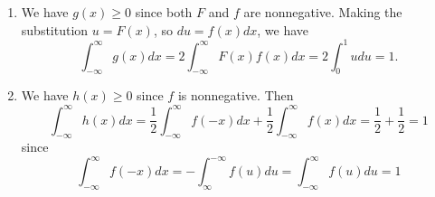 

\setcounter{theorem}{2}
\begin{exercise}[BH.5.3] 
\begin{solution}
    \begin{enumerate}
        \item We have $g(x) \geq 0$ since both $F$ and $f$ are nonnegative. Making the substitution $u=F(x)$, so $d u=f(x) d x$, we have
        $$
        \int_{-\infty}^{\infty} g(x) d x=2 \int_{-\infty}^{\infty} F(x) f(x) d x=2 \int_0^1 u d u=1.
        $$
        \item  We have $h(x) \geq 0$ since $f$ is nonnegative. Then
        $$
        \int_{-\infty}^{\infty} h(x) d x=\frac{1}{2} \int_{-\infty}^{\infty} f(-x) d x+\frac{1}{2} \int_{-\infty}^{\infty} f(x) d x=\frac{1}{2}+\frac{1}{2}=1
        $$
        since
        $$
        \int_{-\infty}^{\infty} f(-x) d x=-\int_{\infty}^{-\infty} f(u) d u=\int_{-\infty}^{\infty} f(u) d u=1
        $$
    \end{enumerate}
\end{solution}
\end{exercise}


